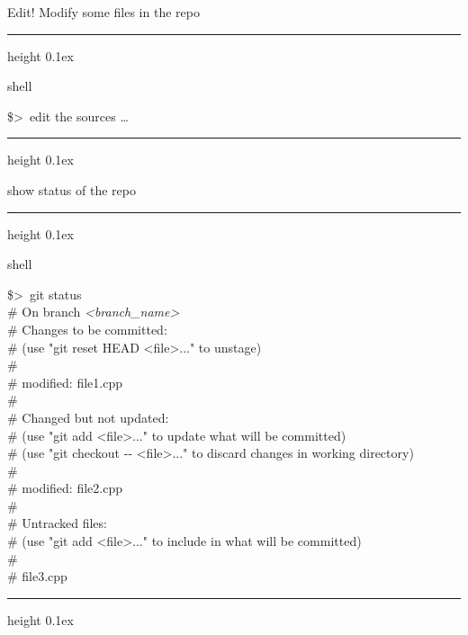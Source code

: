 \documentclass[hyperref={colorlinks}]{beamer}
\newenvironment{shell}{%
\footnotesize\flushleft\hrule height 0.1ex
\tt\begin{beamercolorbox}[sep=1ex,left]{shell}%
}{%
\end{beamercolorbox}
\hrule height 0.1ex
\endflushleft\par
}
\newcommand*{\tshell}[1]{{\usebeamercolor[fg]{shell}\colorbox{bg}{\tt#1}}}
\newcommand*{\psone}[1][ant]{\$>~}
\newcommand*{\var}[1]{{\it<#1>}}
\begin{document}
%
\begin{frame}{Edit!}
Modify some files in the repo
\begin{shell}
\psone edit the sources \ldots \\
\end{shell}
show status of the repo
\begin{shell}
\psone git status \\
\tiny%
\# On branch \var{branch_name} \\
\# Changes to be committed: \\
\#   (use "git reset HEAD <file>..." to unstage) \\
\# \\
\#       modified:   file1.cpp \\
\# \\
\# Changed but not updated: \\
\#   (use "git add <file>..." to update what will be committed) \\
\#   (use "git checkout -{}- <file>..." to discard changes in working directory) \\
\# \\
\#       modified:   file2.cpp \\
\# \\
\# Untracked files: \\
\#   (use "git add <file>..." to include in what will be committed) \\
\# \\
\#       file3.cpp \\
\end{shell}
\end{frame}
\end{document}

